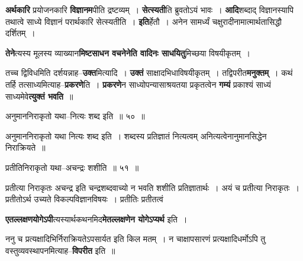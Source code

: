 \documentclass[article,12pt,a4paper]{memoir}
\begin{document}
	  \pstart \textbf{अर्थकारि} प्रयोजनकारि \textbf{विज्ञानम}पीति द्रष्टव्यम् । \textbf{सेत्स्यती}ति ब्रुवतोऽयं भावः । \textbf{आदि}शब्दाद् विज्ञानस्यापि तथात्वे साध्ये विज्ञानं परार्थकारि सेत्स्यतीति । \textbf{इति}र्हेतौ । अनेन सामर्ध्यं चक्षुरादीनामात्मार्थतासिद्धौ दर्शितम् ।
	\pend
      

	  \pstart \textbf{तेने}त्यस्य मूलस्य व्याख्यान\textbf{मिष्टसाधन  वचनेनेति वादिनः साधयितु}मिच्छया विषयीकृतम् ।
	\pend
      

	  \pstart तच्च द्विविधमिति दर्शयन्नाह--\textbf{उक्त}मित्यादि । \textbf{उक्तं} साक्षादभिधाविषयीकृतम् । तद्विपरीत\textbf{मनुक्तम्} । कथं तर्हि तत्साध्यमित्याह--\textbf{प्रकरणे}ति । \textbf{प्रकरणे}न साध्योपन्यासाश्रयतया प्रकृतत्वेन \textbf{गम्यं} प्रकाश्यं साध्यं साध्यमेवे\textbf{त्युक्तं भवति} ॥
	\pend
	  \bigskip
	  \begingroup
	
	  \bigskip
	  \begingroup
	

	  \pstart अनुमाननिराकृतो यथा--नित्यः शब्द इति ॥ ५० ॥
	\pend
      
	  \endgroup
	 

	  \pstart {}अनुमाननिराकृतो यथा नित्यः शब्द इति । शब्दस्य प्रतिज्ञातं नित्यत्वम् अनित्यत्वेनानुमानसिद्धेन निराक्रियते ॥
	\pend
        
	  \bigskip
	  \begingroup
	

	  \pstart प्रतीतिनिराकृतो यथा--अचन्द्रः शशीति ॥ ५१ ॥
	\pend
      
	  \endgroup
	 

	  \pstart प्रतीत्या निराकृतः अचन्द्र इति चन्द्रशब्दवाच्यो न भवति शशीति प्रतिज्ञातार्थः । अयं च प्रतीत्या निराकृतः । प्रतीतोऽर्थ उच्यते विकल्पविज्ञानविषयः । प्रतीतिः प्रतीतत्वं
	\pend
      
	  \endgroup
	

	  \pstart \textbf{एतल्लक्षणयोगेऽपी}त्यस्यार्थकथनमिद\textbf{मेतल्लक्षणेन योगेऽप्यर्थ} इति ।
	\pend
      

	  \pstart ननु च प्रत्यक्षादिभिर्निराक्रियतेऽपसार्यत इति किल मतम् । न चाक्षापसारणं प्रत्यक्षादिधर्मोऽपि तु वस्तुव्यवस्थापनमित्याह--\textbf{विपरीत} इति ॥
	\pend
      
\end{document}
